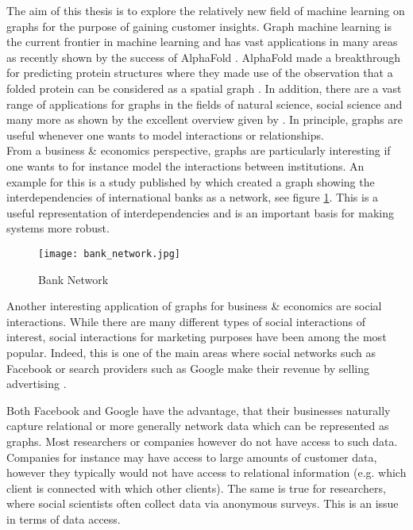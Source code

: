 	
	The aim of this thesis is to explore the relatively new field of machine
	learning on graphs for the purpose of gaining customer insights. Graph
	machine learning is the current frontier in machine learning and has vast
	applications in many areas as recently shown by the success of AlphaFold
	\citep{senior2020improved}. AlphaFold made a breakthrough for predicting
	protein structures where they made use of the observation that a folded
	protein can be considered as a spatial graph \citep{AlphaFoldTeam2020}. In
	addition, there are a vast range of applications for graphs in the fields of 
	natural science, social science and many more as shown by the excellent 
	overview given by \cite{zhou2020graph}. In principle, graphs are useful 
	whenever one wants to model interactions or relationships. \\

	\noindent From a business \& economics perspective, graphs are particularly
	interesting if one wants to for instance model the interactions between
	institutions. An example for this is a study published by
	\cite{schweitzer2009economic} which created a graph showing the 
	interdependencies of international banks as a network, see figure 
	\ref{fig:bank_network}. This is a useful representation of interdependencies 
	and is an important basis for making systems more robust. \\

	\begin{figure}
		\centering
		\texttt{[image: bank\_network.jpg]}
		\caption{Bank Network}
		\cite[p. 424]{schweitzer2009economic}
		\label{fig:bank_network}
	\end{figure}

	\noindent Another interesting application of graphs for business \& 
	economics are social interactions. While there are many different types of
	social interactions of interest, social interactions for marketing
	purposes have been among the most popular. Indeed, this is one of the main
	areas where social networks such as Facebook or search providers such as 
	Google make their revenue by selling advertising 
	\citep{Facebook2021,Alphabet2021}.

	\noindent Both Facebook and Google have the advantage, that their businesses
	naturally capture relational or more generally network data which can be
	represented as graphs. Most researchers or companies however do not have 
	access to such data. Companies for instance may have access to large
	amounts of customer data, however they typically would not have access to
	relational information (e.g. which client is connected with which other
	clients). The same is true for researchers, where social scientists
	often collect data via anonymous surveys. This is an issue in terms of data
	access. \\

